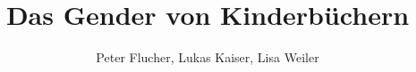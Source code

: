 \documentclass[
	fontsize=12pt,	%
	pagesize,
     ]{scrreprt}		%
\title{Das Gender von Kinderbüchern}
\author{Peter Flucher, Lukas Kaiser, Lisa Weiler}
\date{}
\begin{document}
\maketitle
\recalctypearea
\singlespacing
\tableofcontents
\listoftables %
\onehalfspacing

\newpage 





\pagebreak
\singlespacing

\printbibliography%





  


%

\end{document}

